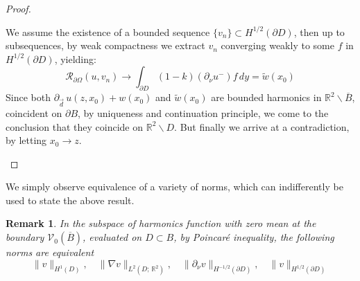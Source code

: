 \documentclass[10pt, a4paper, twoside, openright]{book}
\theoremstyle{definition}
\theoremstyle{plain}
\theoremstyle{plain}
\theoremstyle{plain}
\theoremstyle{plain}
\newtheorem{remark}[subsection]{Remark}
\theoremstyle{plain}
\theoremstyle{plain}
\theoremstyle{plain}
\theoremstyle{plain}
\begin{document}
\begin{proof}
\begin{enumerate}
\begin{equation}
  \end{equation}
  We assume the existence of a bounded sequence $\{v_n\} \subset H^{1/2}(\partial D)$, then up to subsequences, by weak compactness we extract $v_n$ converging weakly to some $f$ in $H^{1/2}(\partial D)$, yielding:
  \begin{equation}
   \mathcal{R}_{\partial \Omega}(u,v_n) \to \int_{\partial D}(1-k)(\partial_\nu u^- )f\,dy = \widetilde{w}(x_0)
  \end{equation}
 Since both $\partial_{\vec{d}}\,u(z,x_0) + w(x_0)$ and $\widetilde{w}(x_0)$ are bounded harmonics in $\mathbb{R}^2\backslash\overline{B}$, coincident on $\partial B$, by uniqueness and continuation principle, we come to the conclusion that they coincide on $\mathbb{R}^2\backslash D$. But finally we arrive at a contradiction, by letting $x_0\to z$.
 \end{enumerate}
\end{proof}
We simply observe equivalence of a variety of norms, which can indifferently be used to state the above result.
\begin{remark}
 In the subspace of harmonics function with zero mean at the boundary $\mathcal{V}_0(\overline{B})$, evaluated on $D\subset B$, by Poincaré inequality, the following norms are equivalent
 \begin{equation}
  \|v\|_{H^1(D)},\quad\|\nabla v\|_{L^2(D;\,\mathbb{R}^2)},\quad \|\partial_\nu v\|_{H^{-1/2}(\partial D)},\quad \|v\|_{H^{1/2}(\partial D)}
 \end{equation}

\end{remark}
\end{document}
